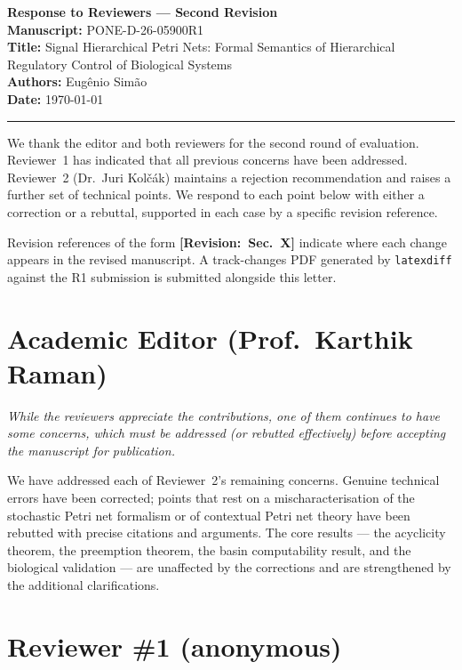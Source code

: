 \documentclass[11pt,letterpaper]{article}
\newcommand{\rquote}[1]{\begin{mdframed}[style=reviewquote]\textit{#1}\end{mdframed}}
\newcommand{\sref}[1]{\textbf{[Revision:~#1]}}
\begin{document}
\textbf{Response to Reviewers --- Second Revision}\\
\textbf{Manuscript:} PONE-D-26-05900R1\\
\textbf{Title:} Signal Hierarchical Petri Nets: Formal Semantics of
Hierarchical Regulatory Control of Biological Systems\\
\textbf{Authors:} Eug\^{e}nio Sim\~{a}o\\
\textbf{Date:} \today

\bigskip\hrule\bigskip

We thank the editor and both reviewers for the second round of evaluation.
Reviewer~1 has indicated that all previous concerns have been addressed.
Reviewer~2 (Dr.\ Juri Kolč{\'a}k) maintains a rejection recommendation
and raises a further set of technical points.
We respond to each point below with either a correction or a rebuttal,
supported in each case by a specific revision reference.

Revision references of the form \sref{Sec.~X} indicate where each change
appears in the revised manuscript.
A track-changes PDF generated by \texttt{latexdiff} against the R1 submission
is submitted alongside this letter.

\bigskip

\section*{Academic Editor (Prof.\ Karthik Raman)}

\rquote{While the reviewers appreciate the contributions, one of them
continues to have some concerns, which must be addressed (or rebutted
effectively) before accepting the manuscript for publication.}

We have addressed each of Reviewer~2's remaining concerns.
Genuine technical errors have been corrected; points that rest on a
mischaracterisation of the stochastic Petri net formalism or of contextual
Petri net theory have been rebutted with precise citations and arguments.
The core results --- the acyclicity theorem, the preemption theorem, the basin
computability result, and the biological validation --- are unaffected by the
corrections and are strengthened by the additional clarifications.

\bigskip

\section*{Reviewer \#1 (anonymous)}
\end{document}
